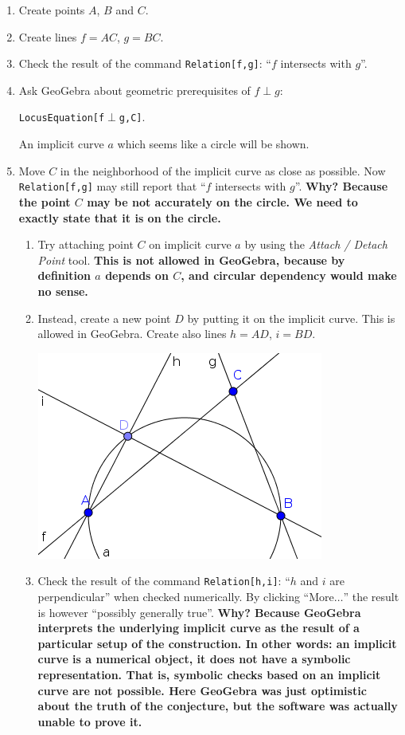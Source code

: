 \documentclass{article}
\begin{document}
\begin{enumerate}
    \item Create points $A$, $B$ and $C$.
    \item Create lines $f=AC$, $g=BC$.
    \item Check the result of the command \texttt{Relation[f,g]}: ``$f$ intersects with $g$''.
    \item Ask GeoGebra about geometric prerequisites of $f\perp g$:
\begin{center}\texttt{LocusEquation[f$\perp$g,C]}.\end{center}
An implicit curve $a$ which seems like a circle will be shown.
    \item Move $C$ in the neighborhood of the implicit curve as close as possible. Now \texttt{Relation[f,g]} may still report that ``$f$ intersects with $g$''. \textbf{Why? Because the point $C$ may be not accurately on the circle. We need to exactly state that it is on the circle.}
    \begin{enumerate}
      \item Try attaching point $C$ on implicit curve $a$ by using the \textit{Attach / Detach Point} tool. \textbf{This is not allowed in GeoGebra, because by definition $a$ depends on $C$, and circular dependency would make no sense.}
      \item Instead, create a new point $D$ by putting it on the implicit curve. This is allowed in GeoGebra. Create also lines $h=AD$, $i=BD$.
\begin{center}
\includegraphics[scale=0.5]{limitations-Thales1-2}
\end{center}
      \item Check the result of the command \texttt{Relation[h,i]}: ``$h$ and $i$ are perpendicular'' when checked numerically. By clicking ``More$\ldots$'' the result is however ``possibly generally true''. \textbf{Why? Because GeoGebra interprets the underlying implicit curve as the result of a particular setup of the construction. In other words: an implicit curve is a numerical object, it does not have a symbolic representation. That is, symbolic checks based on an implicit curve are not possible. Here GeoGebra was just optimistic about the truth of the conjecture, but the software was actually unable to prove it.}

\end{enumerate}
\end{enumerate}
\end{document}
